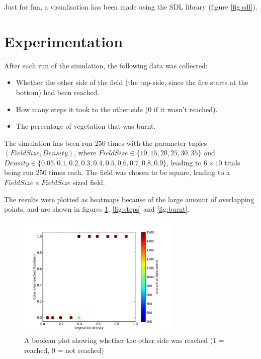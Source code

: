 \documentclass[a4paper]{report}
\begin{document}
Just for fun, a visualisation has been made using the SDL library (figure
\ref{fig:sdl}).


\section{Experimentation} 
\label{sec:ff_exp}

After each run of the simulation, the following data was collected:
\begin{itemize}
    \item Whether the other side of the field (the top-side, since the fire
        starts at the bottom) had been reached.
    \item How many steps it took to the other side (0 if it wasn't reached).
    \item The percentage of vegetation that was burnt.
\end{itemize}

The simulation has been run 250 times with the parameter tuples $(FieldSize,
Density)$, where $FieldSize \in \{10, 15, 20, 25, 30, 35\}$ and \\
$Density \in \{0.05, 0.1, 0.2, 0.3, 0.4, 0.5, 0.6, 0.7, 0.8, 0.9\}$, leading to
$6 \times 10$ trials being run 250 times each. The field
was chosen to be square, leading to a $FieldSize \times FieldSize$ sized field.

The results were plotted as heatmaps because of the large amount of overlapping
points, and are shown in figures \ref{fig:reached}, \ref{fig:steps} and
\ref{fig:burnt}.

\begin{figure}[htbp]
    \centering
    \includegraphics[width=0.7\textwidth]{./density_vs_reached.png}
    \caption{A boolean plot showing whether the other side was reached (1 =
             reached, 0 = not reached)}
    \label{fig:reached}
\end{figure}
\end{document}
